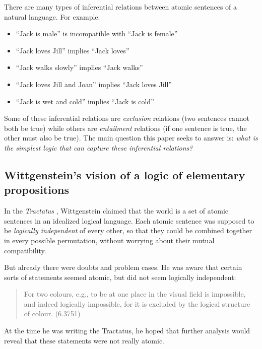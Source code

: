 There are many types of inferential relations between atomic
sentences of a natural language.  For example:

\begin{itemize}

\item ``Jack is male'' is incompatible with ``Jack is female''
\item ``Jack loves Jill'' implies ``Jack loves''
\item ``Jack walks slowly'' implies ``Jack walks''
\item ``Jack loves Jill and Joan'' implies ``Jack loves Jill''
\item ``Jack is wet and cold'' implies ``Jack is cold''

\end{itemize}

\NI Some of these inferential relations are \emph{exclusion}
relations (two sentences cannot both be true) while others are
\emph{entailment} relations (if one sentence is true, the other must
also be true).  The main question this paper seeks to answer is:
\emph{what is the simplest logic that can capture these inferential
  relations?}

\subsection{Wittgenstein's vision of a logic of elementary propositions}

\NI In the \emph{Tractatus} \cite{wittgenstein-tractatus}, Wittgenstein
claimed that the world is a set of atomic sentences in an idealized
logical language.  Each atomic sentence was supposed to be
\emph{logically independent} of every other, so that they could be
combined together in every possible permutation, without worrying
about their mutual compatibility.

But already there were doubts and problem cases.  He was aware that
certain sorts of statements seemed atomic, but did not seem logically
independent:

\begin{quote}
  For two colours, e.g., to be at one place in the visual field is
  impossible, and indeed logically impossible, for it is excluded by
  the logical structure of colour. (6.3751)
\end{quote}

\NI At the time he was writing the Tractatus, he hoped that further
analysis would reveal that these statements were not really atomic.

